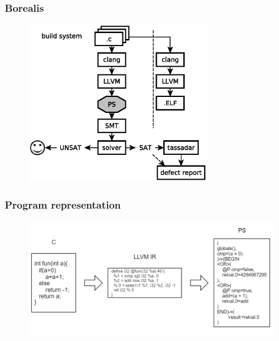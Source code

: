 
\begin{frame}
	\frametitle{Borealis}
	
	\begin{figure}
	\includegraphics[width=80mm]{image/BorealisOverview}
	\end{figure}	
	
\end{frame}


\begin{frame}
	\frametitle{Program representation}
	\begin{figure}
	\includegraphics[width=110mm, keepaspectratio]{image/PSdef}
	\end{figure}
\end{frame}



